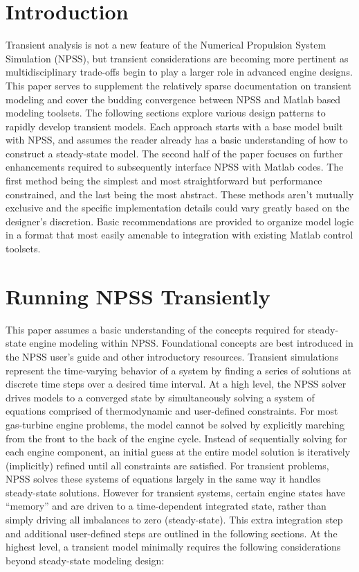 \documentclass[heading.tex]{subfiles}
\begin{document}

\section{Introduction}

Transient analysis is not a new feature of the Numerical Propulsion System Simulation
(NPSS), but transient considerations are becoming more pertinent 
as multidisciplinary trade-offs begin to play a larger role in advanced engine designs.
This paper serves to supplement the relatively sparse documentation on transient modeling
and cover the budding convergence between NPSS and Matlab based modeling toolsets.
The following sections explore various design patterns to rapidly develop transient models.
Each approach starts with a base model built with NPSS, and assumes the reader already has a basic
understanding of how to construct a steady-state model. The second half of the paper
focuses on further enhancements required to subsequently interface NPSS with Matlab codes.
The first method being the simplest and most straightforward but performance constrained,
and the last being the most abstract.
These methods aren't mutually exclusive and the specific implementation
details could vary greatly based on the designer's discretion.
Basic recommendations are provided to organize model logic in a format that most
easily amenable to integration with existing Matlab control toolsets.

\section{Running NPSS Transiently}

This paper assumes a basic understanding of the concepts required for steady-state engine modeling within NPSS.
Foundational concepts are best introduced in the NPSS user's guide \cite{NPSS} and other introductory resources.
\cite{JonesIntro}
Transient simulations represent the time-varying behavior of a system by finding
a series of solutions at discrete time steps over a desired time interval.
At a high level, the NPSS solver drives models to a converged state
by simultaneously solving a system of equations comprised of thermodynamic and
user-defined constraints. For most gas-turbine engine problems,
the model cannot be solved by explicitly marching from the front to the back of
the engine cycle. Instead of sequentially solving for each engine component,
an initial guess at the entire model solution is iteratively (implicitly) refined
until all constraints are satisfied. 
For transient problems, NPSS solves these systems of
equations largely in the same way it handles steady-state solutions.
However for transient systems, certain engine states have ``memory''
and are driven to a time-dependent integrated state,
rather than simply driving all imbalances to zero (steady-state).
This extra integration step and additional user-defined steps are outlined in the following sections.
At the highest level, a transient model minimally requires the following
considerations beyond steady-state modeling design:
\end{document}
